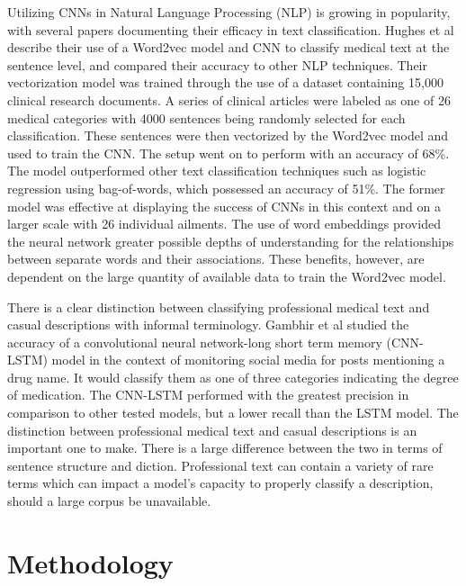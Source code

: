 \documentclass[12pt]{report}
\begin{document}
Utilizing CNNs in Natural Language Processing (NLP) is growing in popularity,
with several papers documenting their efficacy in text classification. Hughes
et al describe their use of a Word2vec model and CNN to classify medical text
at the sentence level, and compared their accuracy to other NLP techniques.
Their vectorization model was trained through the use of a dataset containing
15,000 clinical research documents. A series of clinical articles were
labeled as one of 26 medical categories with 4000 sentences being
randomly selected for each classification. These sentences were then vectorized
by the Word2vec model and used to train the CNN. The setup went on to
perform with an accuracy of 68\%. The model outperformed other text classification techniques
such as logistic regression using bag-of-words, which possessed an
accuracy of 51\%. The former model was effective at displaying the success of CNNs
in this context and on a larger scale with 26 individual ailments. The use of
word embeddings provided the neural network greater possible depths of
understanding for the relationships between separate words and their
associations. These benefits, however, are dependent on the large quantity of
available data to train the Word2vec model\cite{HughesLKS17}.

There is a clear distinction between classifying professional medical text
and casual descriptions with informal terminology. Gambhir et al studied the
accuracy of a convolutional neural network-long short term memory (CNN-LSTM)
model in the context of monitoring social media for posts mentioning a drug name.
It would classify them as one of three categories indicating the degree of medication.
The CNN-LSTM performed with the greatest precision in
comparison to other tested models, but a lower recall than the LSTM model.
The distinction between professional medical text and casual descriptions is
an important one to make. There is a large difference between the two in
terms of sentence structure and diction. Professional text can contain a
variety of rare terms which can impact a model's
capacity to properly classify a description, should a large corpus be
unavailable\cite{tokala-etal-2018-deep}.


\chapter{Methodology}
\end{document}
